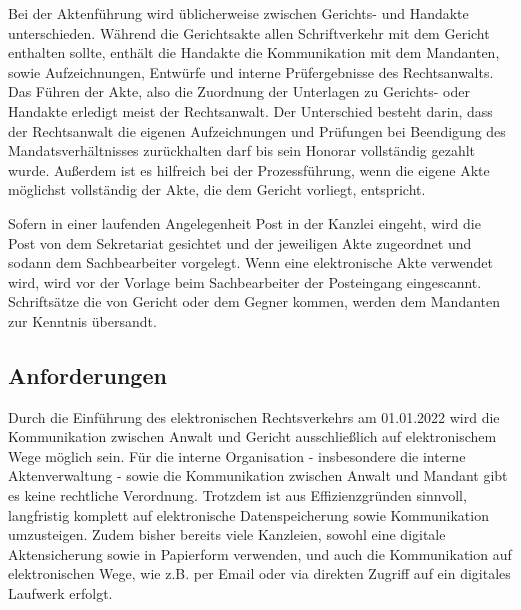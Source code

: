Bei der Aktenführung wird üblicherweise zwischen Gerichts- und Handakte unterschieden. Während die Gerichtsakte allen Schriftverkehr mit dem Gericht enthalten sollte, enthält die Handakte die Kommunikation mit dem Mandanten, sowie Aufzeichnungen, Entwürfe und interne Prüfergebnisse des Rechtsanwalts. Das Führen der Akte, also die Zuordnung der Unterlagen zu Gerichts- oder Handakte erledigt meist der Rechtsanwalt. Der Unterschied besteht darin, dass der Rechtsanwalt die eigenen Aufzeichnungen und Prüfungen bei Beendigung des Mandatsverhältnisses zurückhalten darf bis sein Honorar vollständig gezahlt wurde. Außerdem ist es hilfreich bei der Prozessführung, wenn die eigene Akte möglichst vollständig der Akte, die dem Gericht vorliegt, entspricht.
 
Sofern in einer laufenden Angelegenheit Post in der Kanzlei eingeht, wird die Post von dem Sekretariat gesichtet und der jeweiligen Akte zugeordnet und sodann dem Sachbearbeiter vorgelegt. Wenn eine elektronische Akte verwendet wird, wird vor der Vorlage beim Sachbearbeiter der Posteingang eingescannt. Schriftsätze die von Gericht oder dem Gegner kommen, werden dem Mandanten zur Kenntnis übersandt.

\subsection{Anforderungen}
Durch die Einführung des elektronischen Rechtsverkehrs am 01.01.2022 wird die Kommunikation zwischen Anwalt und Gericht ausschließlich auf elektronischem Wege möglich sein. Für die interne Organisation - insbesondere die interne Aktenverwaltung - sowie die Kommunikation zwischen Anwalt und Mandant gibt es keine rechtliche Verordnung. Trotzdem ist aus Effizienzgründen sinnvoll, langfristig komplett auf elektronische Datenspeicherung sowie Kommunikation umzusteigen. Zudem bisher bereits viele Kanzleien, sowohl eine digitale Aktensicherung sowie in Papierform verwenden, und auch die Kommunikation auf elektronischen Wege, wie z.B. per Email oder via direkten Zugriff auf ein digitales Laufwerk erfolgt. 
